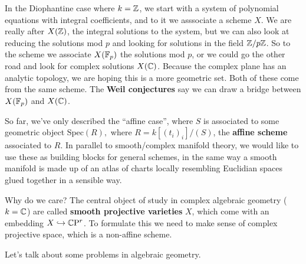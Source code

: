 In the Diophantine case where  $k=\mathbb{Z}$, we start with a system of polynomial equations with integral coefficients, and to it we asssociate a scheme $X$. We are really after $X(\mathbb{Z})$, the integral solutions to the system, but we can also look at reducing the solutions mod $p$ and looking for solutions in the field $\mathbb{Z} /p \mathbb{Z}$. So to the scheme we associate $X(\mathbb{F}_p)$ the solutions mod $p$, or we could go the other road and look for complex solutions $X(\mathbb{C})$. Because the complex plane has an analytic topology, we are hoping this is a more geometric set. Both of these come from the same scheme. The \textbf{Weil conjectures} say we can draw a bridge between $X(\mathbb{F}_p)$ and $X(\mathbb{C})$.
\begin{note}
    So far, we've only described the ``affine case'', where $S $ is associated to some geometric object $\mathrm{Spec}(R),$ where $ R=k[(t_i )_i ] / (S)$, the \textbf{affine scheme} associated to $R$. In parallel to smooth/complex manifold theory, we would like to use these as building blocks for general schemes, in the same way a smooth manifold is made up of an atlas of charts locally resembling Euclidian spaces glued together in a sensible way. 

    Why do we care? The central object of study in complex algebraic geometry ($k=\mathbb{C}$) are called \textbf{smooth projective varieties} $X$, which come with an embedding $X \hookrightarrow \mathbb{C} \mathrm{P}^r$. To formulate this we need to make sense of complex projective space, which is a non-affine scheme.
\end{note}
\orbreak
Let's talk about some problems in algebraic geometry. 
